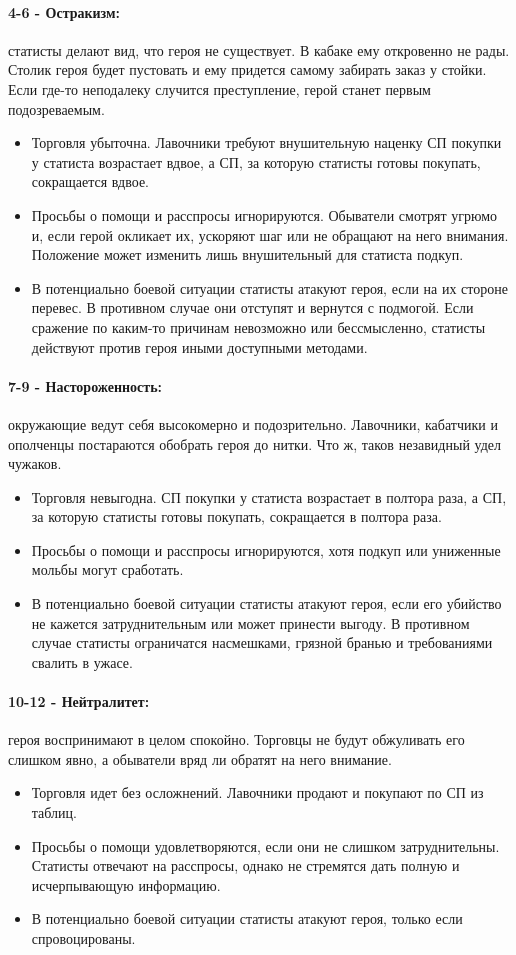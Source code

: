 \paragraph{4-6 - Остракизм:} статисты делают вид, что героя не существует. В кабаке ему откровенно не рады. Столик героя будет пустовать и ему придется самому забирать заказ у стойки. Если где-то неподалеку случится преступление, герой станет первым подозреваемым.
\begin{itemize}
  \item Торговля убыточна. Лавочники требуют внушительную наценку СП покупки у статиста возрастает вдвое, а СП, за которую статисты готовы покупать, сокращается вдвое.
  \item Просьбы о помощи и расспросы игнорируются. Обыватели смотрят угрюмо и, если герой окликает их, ускоряют шаг или не обращают на него внимания. Положение может изменить лишь внушительный для статиста подкуп. 
  \item В потенциально боевой ситуации статисты атакуют героя, если на их стороне перевес. В противном случае они отступят и вернутся с подмогой. Если сражение по каким-то причинам невозможно или бессмысленно, статисты действуют против героя иными доступными методами.
\end{itemize}
\paragraph{7-9 - Настороженность:} окружающие ведут себя высокомерно и подозрительно. Лавочники, кабатчики и ополченцы постараются обобрать героя до нитки. Что ж, таков незавидный удел чужаков.
\begin{itemize}
  \item Торговля невыгодна. СП покупки у статиста возрастает в полтора раза, а СП, за которую статисты готовы покупать, сокращается в полтора раза.
  \item Просьбы о помощи и расспросы игнорируются, хотя подкуп или униженные мольбы могут сработать.
  \item В потенциально боевой ситуации статисты атакуют героя, если его убийство не кажется затруднительным или может принести выгоду. В противном случае статисты ограничатся насмешками, грязной бранью и требованиями свалить в ужасе.
\end{itemize}
\paragraph{10-12 - Нейтралитет:} героя воспринимают в целом спокойно. Торговцы не будут обжуливать его слишком явно, а обыватели вряд ли обратят на него внимание.
\begin{itemize}
  \item Торговля идет без осложнений. Лавочники продают и покупают по СП из таблиц.
  \item Просьбы о помощи удовлетворяются, если они не слишком затруднительны. Статисты отвечают на расспросы, однако не стремятся дать полную и исчерпывающую информацию.
  \item В потенциально боевой ситуации статисты атакуют героя, только если спровоцированы.
\end{itemize}
